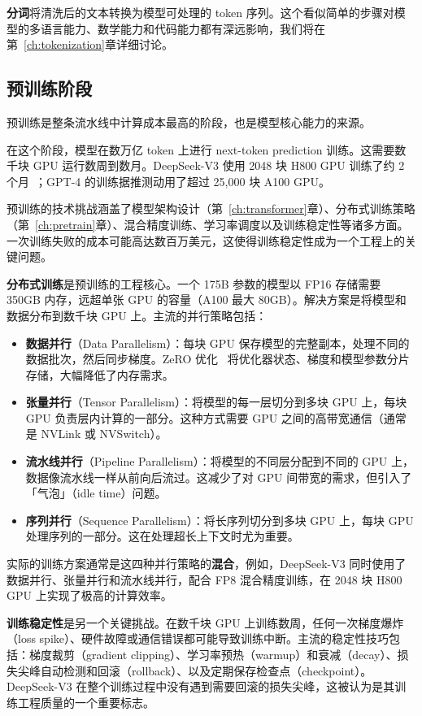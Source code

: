 \textbf{分词}将清洗后的文本转换为模型可处理的 token 序列。这个看似简单的步骤对模型的多语言能力、数学能力和代码能力都有深远影响，我们将在第~\ref{ch:tokenization}章详细讨论。

\subsection{预训练阶段}

预训练是整条流水线中计算成本最高的阶段，也是模型核心能力的来源。

在这个阶段，模型在数万亿 token 上进行 next-token prediction 训练。这需要数千块 GPU 运行数周到数月。DeepSeek-V3 使用 2048 块 H800 GPU 训练了约 2 个月~\cite{deepseekv3}；GPT-4 的训练据推测动用了超过 25,000 块 A100 GPU。

预训练的技术挑战涵盖了模型架构设计（第~\ref{ch:transformer}章）、分布式训练策略（第~\ref{ch:pretrain}章）、混合精度训练、学习率调度以及训练稳定性等诸多方面。一次训练失败的成本可能高达数百万美元，这使得训练稳定性成为一个工程上的关键问题。

\textbf{分布式训练}是预训练的工程核心。一个 175B 参数的模型以 FP16 存储需要 350GB 内存，远超单张 GPU 的容量（A100 最大 80GB）。解决方案是将模型和数据分布到数千块 GPU 上。主流的并行策略包括：
\begin{itemize}[noitemsep]
  \item \textbf{数据并行}（Data Parallelism）：每块 GPU 保存模型的完整副本，处理不同的数据批次，然后同步梯度。ZeRO 优化~\cite{rajbhandari2020zero} 将优化器状态、梯度和模型参数分片存储，大幅降低了内存需求。
  \item \textbf{张量并行}（Tensor Parallelism）：将模型的每一层切分到多块 GPU 上，每块 GPU 负责层内计算的一部分。这种方式需要 GPU 之间的高带宽通信（通常是 NVLink 或 NVSwitch）。
  \item \textbf{流水线并行}（Pipeline Parallelism）：将模型的不同层分配到不同的 GPU 上，数据像流水线一样从前向后流过。这减少了对 GPU 间带宽的需求，但引入了「气泡」（idle time）问题。
  \item \textbf{序列并行}（Sequence Parallelism）：将长序列切分到多块 GPU 上，每块 GPU 处理序列的一部分。这在处理超长上下文时尤为重要。
\end{itemize}

实际的训练方案通常是这四种并行策略的\textbf{混合}，例如，DeepSeek-V3 同时使用了数据并行、张量并行和流水线并行，配合 FP8 混合精度训练，在 2048 块 H800 GPU 上实现了极高的计算效率。

\textbf{训练稳定性}是另一个关键挑战。在数千块 GPU 上训练数周，任何一次梯度爆炸（loss spike）、硬件故障或通信错误都可能导致训练中断。主流的稳定性技巧包括：梯度裁剪（gradient clipping）、学习率预热（warmup）和衰减（decay）、损失尖峰自动检测和回滚（rollback）、以及定期保存检查点（checkpoint）。DeepSeek-V3 在整个训练过程中没有遇到需要回滚的损失尖峰，这被认为是其训练工程质量的一个重要标志。

